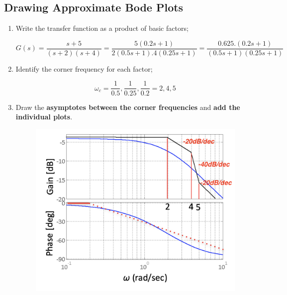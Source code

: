 \subsection{Drawing Approximate Bode Plots}
\begin{enumerate}
\item Write the transfer function as a product of basic factors;
    \begin{tcolorbox}[breakable, title=Example]
        \[G(s) = \frac{s+5}{(s+2)(s+4)}=\frac{5(0.2s+1)}{2(0.5s+1).4(0.25s+1)} = \frac{0.625. (0.2s+1)}{(0.5s+1)(0.25s+1)}\]
    \end{tcolorbox}

    \item Identify the corner frequency for each factor;
    \begin{tcolorbox}[breakable, title=Example cont'd]
        \[\omega_{c} = \frac{1}{0.5} , \frac{1}{0.25} , \frac{1}{0.2} = 2,4,5\]
    \end{tcolorbox}

    \item Draw the \textbf{asymptotes between the corner frequencies} and \textbf{add the individual plots}.
        \begin{figure}[H] 
            \centering
            \includegraphics[width=.5\textwidth]{images/bode_plot.png}
        \end{figure}
\end{enumerate}